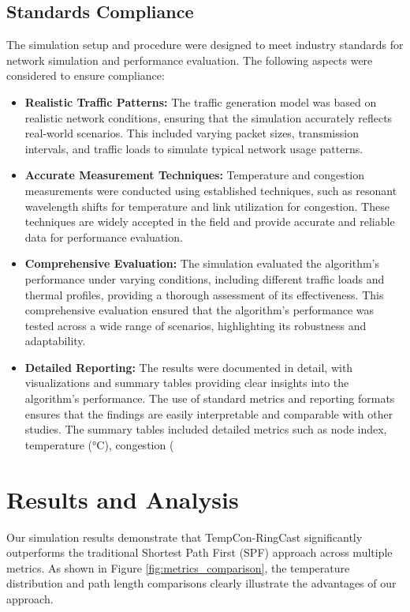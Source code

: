 \documentclass[conference]{IEEEtran}
\begin{document}
\subsection{Standards Compliance}
The simulation setup and procedure were designed to meet industry standards for network simulation and performance evaluation. The following aspects were considered to ensure compliance:
\begin{itemize}
    \item \textbf{Realistic Traffic Patterns:} The traffic generation model was based on realistic network conditions, ensuring that the simulation accurately reflects real-world scenarios. This included varying packet sizes, transmission intervals, and traffic loads to simulate typical network usage patterns.
    \item \textbf{Accurate Measurement Techniques:} Temperature and congestion measurements were conducted using established techniques, such as resonant wavelength shifts for temperature and link utilization for congestion. These techniques are widely accepted in the field and provide accurate and reliable data for performance evaluation.
    \item \textbf{Comprehensive Evaluation:} The simulation evaluated the algorithm's performance under varying conditions, including different traffic loads and thermal profiles, providing a thorough assessment of its effectiveness. This comprehensive evaluation ensured that the algorithm's performance was tested across a wide range of scenarios, highlighting its robustness and adaptability.
    \item \textbf{Detailed Reporting:} The results were documented in detail, with visualizations and summary tables providing clear insights into the algorithm's performance. The use of standard metrics and reporting formats ensures that the findings are easily interpretable and comparable with other studies. The summary tables included detailed metrics such as node index, temperature (°C), congestion (%
\end{itemize}

\section{Results and Analysis}
Our simulation results demonstrate that TempCon-RingCast significantly outperforms the traditional Shortest Path First (SPF) approach across multiple metrics. As shown in Figure \ref{fig:metrics_comparison}, the temperature distribution and path length comparisons clearly illustrate the advantages of our approach.
\end{document}
